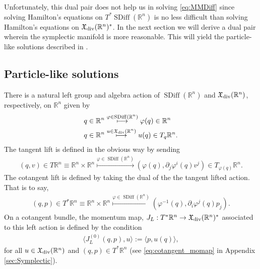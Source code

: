 \documentclass[12pt]{amsart}
\newcommand{\R}{\ensuremath{\mathbb{R}}}
\DeclareMathOperator{\SDiff}{SDiff}
\begin{document}
Unfortunately, this dual pair does not help us in solving \eqref{eq:MMDiff}
since solving Hamilton's equations on $T^*\SDiff(\R^n)$ is no less difficult
than solving Hamilton's equations on $\mathfrak{X}_{\rm div}(\R^n)^*$.
In the next section we will derive a dual pair wherein the symplectic
manifold is more reasonable.
This will yield the particle-like solutions described in \cite{MumfordMichor2013}.

\subsection{Particle-like solutions}
\label{sec:Momentum maps}
There is a natural left group and algebra action of $\SDiff(\R^n)$
and $\mathfrak{X}_{\rm div}(\R^n)$, respectively, on $\R^n$ given by
\begin{align*}
  q \in \R^n
  &\stackrel{ \varphi \in \SDiff(\R^n) }{\longmapsto}
  \varphi(q) \in \R^n \\
  q \in \R^n
  &\stackrel{ u \in \mathfrak{X}_{\rm div}(\R^n) }{\longmapsto}
  u(q) \in T_q\R^n.
\end{align*}
The tangent lift is defined in the obvious way by sending
\begin{align*}
  (q,v) \in T\R^n \equiv \R^n \times \R^n
  \stackrel{ \varphi \in \SDiff(\R^n) }{\longmapsto}
  (\varphi(q) , \partial_j\varphi^i(q) v^j ) \in T_{\varphi(q)} \R^n.
\end{align*}
The cotangent lift is defined by taking the dual
of the the tangent lifted action.
That is to say,
\begin{align*}
  (q, p) \in T^*\R^n \equiv \R^n \times \R^n
  \stackrel{ \varphi \in \SDiff(\R^n) }{\longmapsto}
  (\varphi^{-1}(q) , \partial_i\varphi^j(q) p_j ).
\end{align*}
On a cotangent bundle, the momentum map,
$J_L : T^*\R^n \to \mathfrak{X}_{\rm div}(\R^n)^*$
associated to this left action is defined by the
condition
\begin{align*}
  \langle J_L^{(0)}( q , p) , u \rangle := \langle p , u(q) \rangle,
\end{align*}
for all $u \in \mathfrak{X}_{\rm div}(\R^n)$ and $(q,p) \in T^*\R^n$ (see \eqref{eq:cotangent_momap} in Appendix \ref{sec:Symplectic}).
\end{document}
